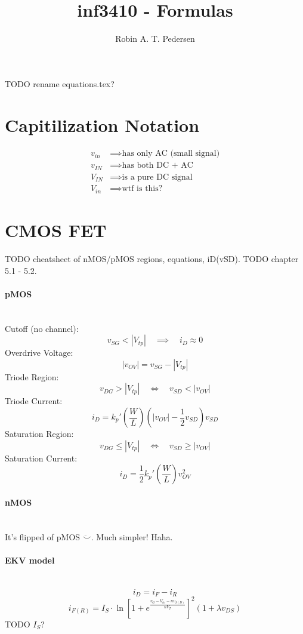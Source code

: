 \documentclass[twocolumn]{article}
\begin{document}
  \title{inf3410 - Formulas}
  \author{Robin A. T. Pedersen}
  \maketitle

  TODO rename equations.tex?

  \section{Capitilization Notation}
    \begin{align}
      v_{in} &\implies \text{has only AC (small signal)} \\
      v_{IN} &\implies \text{has both DC + AC} \\
      V_{IN} &\implies \text{is a pure DC signal} \\
      V_{in} &\implies \text{wtf is this?}
    \end{align}
  \section{CMOS FET}
    TODO cheatsheet of nMOS/pMOS regions, equations, iD(vSD).
    TODO chapter 5.1 - 5.2.

    \paragraph{pMOS} \hfill \\
      Cutoff (no channel):
        $$v_{SG} < |V_{tp}| \quad\implies\quad i_D \approx 0$$
      Overdrive Voltage:
        $$|v_{OV}| = v_{SG} - |V_{tp}|$$
      Triode Region:
        $$v_{DG} > |V_{tp}| \quad\Leftrightarrow\quad v_{SD} < |v_{OV}|$$
      Triode Current:
        $$i_D = k_p' \left( \frac{W}{L} \right)
                     \left( |v_{OV}| - \frac{1}{2} v_{SD} \right) v_{SD}$$
      Saturation Region:
        $$v_{DG} \leq |V_{tp}| \quad\Leftrightarrow\quad v_{SD} \geq |v_{OV}|$$
      Saturation Current:
        $$i_D = \frac{1}{2} k_p' \left( \frac{W}{L} \right) v_{OV}^2$$
    \paragraph{nMOS} \hfill \\
      It's flipped of pMOS $\ddot\smile$. Much simpler! Haha.
    \paragraph{EKV model} \hfill \\
      $$i_D = i_F - i_R$$
      $$i_{F(R)} = I_S \cdot
                   \ln \left[ 1 + e^{\frac{v_G - V_{tn} - nv_{S(D)}}{nV_T}}
                       \right] ^2
                   (1 + \lambda v_{DS})$$
      TODO $I_S$?
\end{document}
